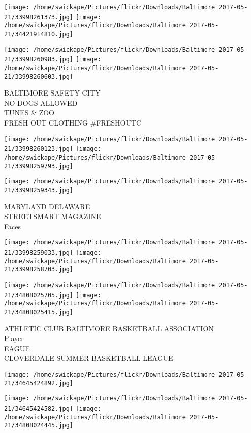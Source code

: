 \documentclass[10pt,letterpaper]{article}
\begin{document}
\texttt{[image: /home/swickape/Pictures/flickr/Downloads/Baltimore 2017-05-21/33998261373.jpg]}
\texttt{[image: /home/swickape/Pictures/flickr/Downloads/Baltimore 2017-05-21/34421914810.jpg]}

\texttt{[image: /home/swickape/Pictures/flickr/Downloads/Baltimore 2017-05-21/33998260983.jpg]}
\texttt{[image: /home/swickape/Pictures/flickr/Downloads/Baltimore 2017-05-21/33998260603.jpg]}

BALTIMORE SAFETY CITY\\
NO DOGS ALLOWED\\
TUNES \& ZOO\\
FRESH OUT CLOTHING \#FRESHOUTC\\
\pagebreak

\texttt{[image: /home/swickape/Pictures/flickr/Downloads/Baltimore 2017-05-21/33998260123.jpg]}
\texttt{[image: /home/swickape/Pictures/flickr/Downloads/Baltimore 2017-05-21/33998259793.jpg]}

\vspace{0.25in}
\texttt{[image: /home/swickape/Pictures/flickr/Downloads/Baltimore 2017-05-21/33998259343.jpg]}

MARYLAND DELAWARE\\
STREETSMART MAGAZINE\\
Faces\\
\pagebreak

\texttt{[image: /home/swickape/Pictures/flickr/Downloads/Baltimore 2017-05-21/33998259033.jpg]}
\texttt{[image: /home/swickape/Pictures/flickr/Downloads/Baltimore 2017-05-21/33998258703.jpg]}

\texttt{[image: /home/swickape/Pictures/flickr/Downloads/Baltimore 2017-05-21/34808025705.jpg]}
\texttt{[image: /home/swickape/Pictures/flickr/Downloads/Baltimore 2017-05-21/34808025415.jpg]}

ATHLETIC CLUB BALTIMORE BASKETBALL ASSOCIATION\\
Player\\
EAGUE\\
CLOVERDALE SUMMER BASKETBALL LEAGUE\\
\pagebreak

\texttt{[image: /home/swickape/Pictures/flickr/Downloads/Baltimore 2017-05-21/34645424892.jpg]}

\vspace{0.25in}
\texttt{[image: /home/swickape/Pictures/flickr/Downloads/Baltimore 2017-05-21/34645424582.jpg]}
\texttt{[image: /home/swickape/Pictures/flickr/Downloads/Baltimore 2017-05-21/34808024445.jpg]}
\end{document}
